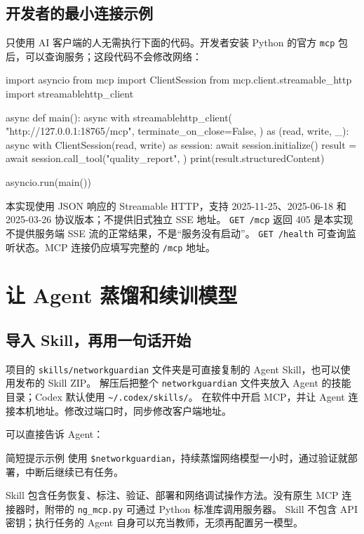 \documentclass[UTF8,fontset=fandol,11pt,a4paper]{ctexart}
\newcommand{\tool}[1]{\nolinkurl{#1}}
\begin{document}
\subsection{开发者的最小连接示例}
只使用 AI 客户端的人无需执行下面的代码。开发者安装 Python 的官方 \tool{mcp} 包后，可以查询服务；这段代码不会修改网络：
\begin{Code}
import asyncio
from mcp import ClientSession
from mcp.client.streamable_http import streamablehttp_client

async def main():
    async with streamablehttp_client(
        "http://127.0.0.1:18765/mcp",
        terminate_on_close=False,
    ) as (read, write, _):
        async with ClientSession(read, write) as session:
            await session.initialize()
            result = await session.call_tool("quality_report", {})
            print(result.structuredContent)

asyncio.run(main())
\end{Code}
本实现使用 JSON 响应的 Streamable HTTP，支持 2025-11-25、2025-06-18 和 2025-03-26 协议版本；不提供旧式独立 SSE 地址。
\tool{GET /mcp} 返回 405 是本实现不提供服务端 SSE 流的正常结果，不是“服务没有启动”。
\tool{GET /health} 可查询监听状态。MCP 连接仍应填写完整的 \tool{/mcp} 地址。

\section{让 Agent 蒸馏和续训模型}
\subsection{导入 Skill，再用一句话开始}
项目的 \tool{skills/networkguardian} 文件夹是可直接复制的 Agent Skill，也可以使用发布的 Skill ZIP。
解压后把整个 \tool{networkguardian} 文件夹放入 Agent 的技能目录；Codex 默认使用 \tool{~/.codex/skills/}。
在软件中开启 MCP，并让 Agent 连接本机地址。修改过端口时，同步修改客户端地址。

可以直接告诉 Agent：
\begin{guidebox}{简短提示示例}
使用 \tool{$networkguardian}，持续蒸馏网络模型一小时，通过验证就部署，中断后继续已有任务。
\end{guidebox}
Skill 包含任务恢复、标注、验证、部署和网络调试操作方法。没有原生 MCP 连接器时，附带的 \tool{ng_mcp.py} 可通过 Python 标准库调用服务器。
Skill 不包含 API 密钥；执行任务的 Agent 自身可以充当教师，无须再配置另一模型。
\end{document}
